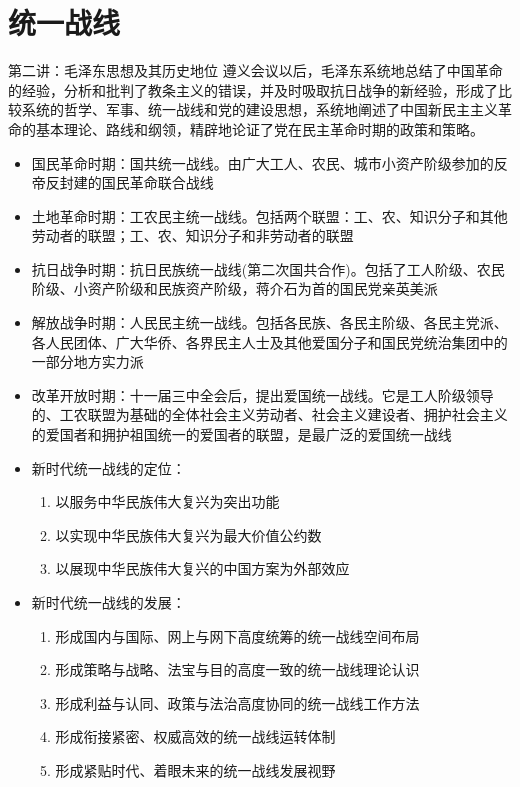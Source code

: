 \documentclass[12pt,openany]{ctexbook}
\begin{document}
\section{统一战线}
第二讲：毛泽东思想及其历史地位
遵义会议以后，毛泽东系统地总结了中国革命的经验，分析和批判了教条主义的错误，并及时吸取抗日战争的新经验，形成了比较系统的哲学、军事、统一战线和党的建设思想，系统地阐述了中国新民主主义革命的基本理论、路线和纲领，精辟地论证了党在民主革命时期的政策和策略。
\begin{itemize}
  \item 国民革命时期：国共统一战线。由广大工人、农民、城市小资产阶级参加的反帝反封建的国民革命联合战线
  \item 土地革命时期：工农民主统一战线。包括两个联盟：工、农、知识分子和其他劳动者的联盟；工、农、知识分子和非劳动者的联盟
  \item 抗日战争时期：抗日民族统一战线(第二次国共合作)。包括了工人阶级、农民阶级、小资产阶级和民族资产阶级，蒋介石为首的国民党亲英美派
  \item 解放战争时期：人民民主统一战线。包括各民族、各民主阶级、各民主党派、各人民团体、广大华侨、各界民主人士及其他爱国分子和国民党统治集团中的一部分地方实力派
  \item 改革开放时期：十一届三中全会后，提出爱国统一战线。它是工人阶级领导的、工农联盟为基础的全体社会主义劳动者、社会主义建设者、拥护社会主义的爱国者和拥护祖国统一的爱国者的联盟，是最广泛的爱国统一战线
  \item 新时代统一战线的定位：
\begin{enumerate}
  \item 以服务中华民族伟大复兴为突出功能
  \item 以实现中华民族伟大复兴为最大价值公约数
  \item 以展现中华民族伟大复兴的中国方案为外部效应
\end{enumerate}
  \item 新时代统一战线的发展：
\begin{enumerate}
  \item 形成国内与国际、网上与网下高度统筹的统一战线空间布局
  \item 形成策略与战略、法宝与目的高度一致的统一战线理论认识
  \item 形成利益与认同、政策与法治高度协同的统一战线工作方法
  \item 形成衔接紧密、权威高效的统一战线运转体制
  \item 形成紧贴时代、着眼未来的统一战线发展视野
\end{enumerate}
\end{itemize}
\end{document}
